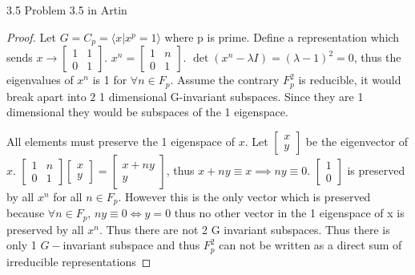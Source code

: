 \documentclass{article}
\newcommand{\angles}[1]{\langle #1 \rangle}
\begin{document}
\bigskip

\begin{PROB}{3.5}\label{Problem 3.5.}
    Problem 3.5 in Artin
\end{PROB}
\begin{proof}
    Let $G = C_p = \angles{x | x^p = 1}$ where p is prime. Define a representation which sends $x \to \begin{bmatrix}
        1 & 1 \\ 0 & 1
    \end{bmatrix}$. $x^n = \begin{bmatrix}
        1 & n \\ 0 & 1
    \end{bmatrix}$. $\det(x^n - \lambda I) = (\lambda - 1)^2 = 0$, thus the eigenvalues of $x^n$ is 1 for $\forall n \in F_p$. Assume the contrary $F_p^2$ is reducible, it would break apart into $2$ 1 dimensional G-invariant subspaces. Since they are 1 dimensional they would be subspaces of the 1 eigenspace. 
    
    All elements must preserve the 1 eigenspace of $x$. Let $\begin{bmatrix}
        x \\ y
    \end{bmatrix}$ be the eigenvector of $x$. $\begin{bmatrix}
        1 & n \\ 0 & 1
    \end{bmatrix}\begin{bmatrix}
        x \\ y
    \end{bmatrix} = \begin{bmatrix}
        x + ny \\ y
    \end{bmatrix}$, thus $x + ny \equiv x \implies ny \equiv 0$. $\begin{bmatrix}
        1 \\ 0
    \end{bmatrix}$ is preserved by all $x^n$ for all $n \in F_p$. However this is the only vector which is preserved because $\forall n \in F_p$, $ny \equiv 0 \iff y = 0$ thus no other vector in the 1 eigenspace of x is preserved by all $x^n$. Thus there are not 2 G invariant subspaces. Thus there is only 1 $G-$invariant subspace and thus $F^2_p$ can not be written as a direct sum of irreducible representations                
\end{proof}
\end{document}
